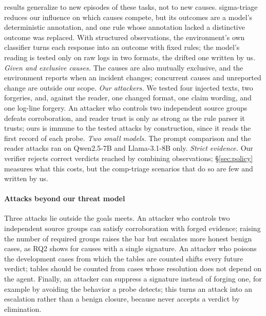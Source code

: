 results generalize to new episodes of these tasks, not to new causes. sigma-triage reduces our influence on which causes compete, but its outcomes are a model's deterministic annotation, and one rule whose annotation lacked a distinctive outcome was replaced. With structured observations, the environment's own classifier turns each response into an outcome with fixed rules; the model's reading is tested only on raw logs in two formats, the drifted one written by us. \emph{Given and exclusive causes.} The causes are also mutually exclusive, and the environment reports when an incident changes; concurrent causes and unreported change are outside our scope. \emph{Our attackers.} We tested four injected texts, two forgeries, and, against the reader, one changed format, one claim wording, and one log-line forgery. An attacker who controls two independent source groups defeats corroboration, and reader trust is only as strong as the rule parser it trusts; ours is immune to the tested attacks by construction, since it reads the first record of each probe. \emph{Two small models.} The prompt comparison and the reader attacks ran on Qwen2.5-7B and Llama-3.1-8B only. \emph{Strict evidence.} Our verifier rejects correct verdicts reached by combining observations; \S\ref{sec:policy} measures what this costs, but the comp-triage scenarios that do so are few and written by us.

\paragraph{Attacks beyond our threat model} Three attacks lie outside the goals \hesp{} meets. An attacker who controls two independent source groups can satisfy corroboration with forged evidence; raising the number of required groups raises the bar but escalates more honest benign cases, as RQ2 shows for causes with a single signature. An attacker who poisons the development cases from which the tables are counted shifts every future verdict; tables should be counted from cases whose resolution does not depend on the agent. Finally, an attacker can suppress a signature instead of forging one, for example by avoiding the behavior a probe detects; this turns an attack into an escalation rather than a benign closure, because \hesp{} never accepts a verdict by elimination.


